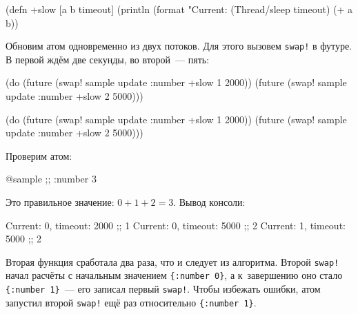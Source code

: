 \else

\begin{english}
  \begin{clojure}
(defn +slow
  [a b timeout]
  (println (format "Current: %
  (Thread/sleep timeout)
  (+ a b))
  \end{clojure}
\end{english}

\fi


Обновим атом одновременно из двух потоков. Для этого вызовем \verb|swap!| в
футуре. В первой ждём две секунды, во второй~--- пять:

\ifnarrow

\begin{english}
  \begin{clojure}
(do (future (swap! sample update
              :number +slow 1 2000))
    (future (swap! sample update
              :number +slow 2 5000)))
  \end{clojure}
\end{english}

\else

\begin{english}
  \begin{clojure}
(do (future (swap! sample update :number +slow 1 2000))
    (future (swap! sample update :number +slow 2 5000)))
  \end{clojure}
\end{english}

\fi

\noindent
Проверим атом:

\begin{english}
  \begin{clojure}
@sample ;; {:number 3}
  \end{clojure}
\end{english}

\noindent
Это правильное значение: $0 + 1 + 2 = 3$. Вывод консоли:

\begin{english}
  \begin{text}
Current: 0, timeout: 2000 ;; 1
Current: 0, timeout: 5000 ;; 2
Current: 1, timeout: 5000 ;; 2
  \end{text}
\end{english}

Вторая функция сработала два раза, что и следует из алгоритма. Второй
\verb|swap!| начал расчёты с начальным значением \verb|{:number 0}|, а
к~завершению оно стало \verb|{:number 1}|~--- его записал первый
\verb|swap!|. Чтобы избежать ошибки, атом запустил второй \verb|swap!| ещё раз
относительно \verb|{:number 1}|.

